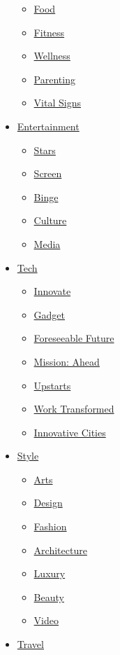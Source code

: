 \begin{itemize}
  \begin{itemize}
  \tightlist
  \item
    \href{/specials/health/food-diet}{Food}
  \item
    \href{/specials/health/fitness-excercise}{Fitness}
  \item
    \href{/specials/health/wellness}{Wellness}
  \item
    \href{/specials/health/parenting}{Parenting}
  \item
    \href{/specials/health/vital-signs}{Vital Signs}
  \end{itemize}
\item
  \href{/entertainment}{Entertainment}

  \begin{itemize}
  \tightlist
  \item
    \href{/entertainment/celebrities}{Stars}
  \item
    \href{/entertainment/movies}{Screen}
  \item
    \href{/entertainment/tv-shows}{Binge}
  \item
    \href{/entertainment/culture}{Culture}
  \item
    \href{/business/media}{Media}
  \end{itemize}
\item
  \href{/business/tech}{Tech}

  \begin{itemize}
  \tightlist
  \item
    \href{/specials/tech/innovate}{Innovate}
  \item
    \href{/specials/tech/gadget}{Gadget}
  \item
    \href{/specials/tech/foreseeable-future}{Foreseeable Future}
  \item
    \href{/specials/tech/mission-ahead}{Mission: Ahead}
  \item
    \href{/specials/tech/upstarts}{Upstarts}
  \item
    \href{/specials/tech/work-transformed}{Work Transformed}
  \item
    \href{/specials/tech/innovative-cities}{Innovative Cities}
  \end{itemize}
\item
  \href{/style}{Style}

  \begin{itemize}
  \tightlist
  \item
    \href{/style/arts}{Arts}
  \item
    \href{/style/design}{Design}
  \item
    \href{/style/fashion}{Fashion}
  \item
    \href{/style/architecture}{Architecture}
  \item
    \href{/style/luxury}{Luxury}
  \item
    \href{/style/beauty}{Beauty}
  \item
    \href{/style/videos}{Video}
  \end{itemize}
\item
  \href{/travel}{Travel}


\end{itemize}
